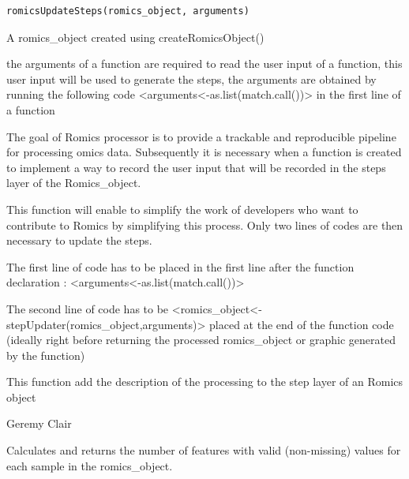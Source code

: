 \documentclass[a4paper]{book}
\begin{document}
%
\begin{Usage}
\begin{verbatim}
romicsUpdateSteps(romics_object, arguments)
\end{verbatim}
\end{Usage}
%
\begin{Arguments}
\begin{ldescription}
\item[\code{romics\_object}] A romics\_object created using createRomicsObject()

\item[\code{arguments}] the arguments of a function are required to read the user input of a function, this user input will be used to generate the steps, the arguments are obtained by running the following code <arguments<-as.list(match.call())> in the first line of a function
\end{ldescription}
\end{Arguments}
%
\begin{Details}
The goal of Romics processor is to provide a trackable and reproducible pipeline for processing omics data. Subsequently it is necessary when a function is created to implement a way to record the user input that will be recorded in the steps layer of the Romics\_object.

This function will enable to simplify the work of developers who want to contribute to Romics by simplifying this process. Only two lines of codes are then necessary to update the steps.

The first line of code has to be placed in the first line after the function declaration : <arguments<-as.list(match.call())>

The second line of code has to be <romics\_object<-stepUpdater(romics\_object,arguments)> placed at the end of the function code (ideally right before returning the processed romics\_object or graphic generated by the function)
\end{Details}
%
\begin{Value}
This function add the description of the processing to the step layer of an Romics object
\end{Value}
%
\begin{Author}
Geremy Clair
\end{Author}
%
\begin{Description}
Calculates and returns the number of features with valid (non-missing) values for each sample in the romics\_object.
\end{Description}
\end{document}
